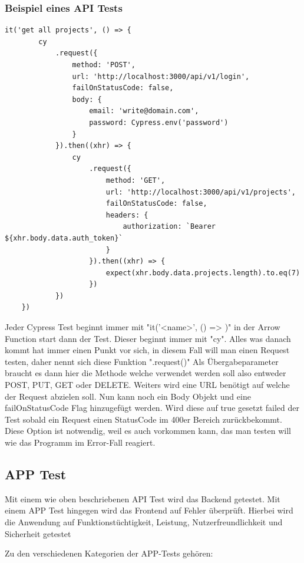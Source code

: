 \subsubsection{Beispiel eines API Tests}
\begin{lstlisting}
it('get all projects', () => {
        cy
            .request({
                method: 'POST',
                url: 'http://localhost:3000/api/v1/login',
                failOnStatusCode: false,
                body: {
                    email: 'write@domain.com',
                    password: Cypress.env('password')
                }
            }).then((xhr) => {
                cy
                    .request({
                        method: 'GET',
                        url: 'http://localhost:3000/api/v1/projects',
                        failOnStatusCode: false,
                        headers: {
                            authorization: `Bearer ${xhr.body.data.auth_token}`
                        }
                    }).then((xhr) => {
                        expect(xhr.body.data.projects.length).to.eq(7)
                    })
            })
    })
\end{lstlisting}

Jeder Cypress Test beginnt immer mit "it('<name>', () => {})" in der Arrow Function start dann der Test. Dieser beginnt immer mit "cy". Alles was danach kommt hat immer einen Punkt vor sich, in diesem Fall will man einen Request testen, daher nennt sich diese Funktion ".request({})" Als Übergabeparameter braucht es dann hier die Methode welche verwendet werden soll also entweder POST, PUT, GET oder DELETE. Weiters wird eine URL benötigt auf welche der Request abzielen soll. Nun kann noch ein Body Objekt und eine failOnStatusCode Flag hinzugefügt werden. Wird diese auf true gesetzt failed der Test sobald ein Request einen StatusCode im 400er Bereich zurückbekommt. Diese Option ist notwendig, weil es auch vorkommen kann, das man testen will wie das Programm im Error-Fall reagiert.
\cite{API_Tests}
\subsection{APP Test}
Mit einem wie oben beschriebenen API Test wird das Backend getestet. Mit einem APP Test hingegen wird das Frontend auf Fehler überprüft. Hierbei wird die Anwendung auf Funktionstüchtigkeit, Leistung, Nutzerfreundlichkeit und Sicherheit getestet

Zu den verschiedenen Kategorien der APP-Tests gehören:

